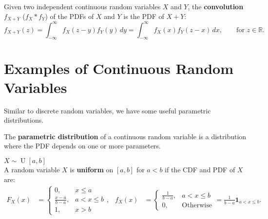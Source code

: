 \documentclass{huhtakm-template-book-v2}
\DeclareMathOperator{\U}{U}
\begin{document}
    \begin{defn}
        Given two independent continuous random variables $X$ and $Y$, the \textbf{convolution} $f_{X+Y}$ ($f_{X}*f_{Y}$) of the PDFs of $X$ and $Y$ is the PDF of $X+Y$:
        \begin{equation*}
            f_{X+Y}(z) = \int_{-\infty}^{\infty} f_{X}(z-y)f_{Y}(y)\,dy = \int_{-\infty}^{\infty} f_{X}(x)f_{Y}(z-x)\,dx, \qquad\text{for }z \in \mathbb{R}.
        \end{equation*}
    \end{defn}
    \newpage

\section{Examples of Continuous Random Variables}
    Similar to discrete random variables, we have some useful parametric distributions.
    \begin{defn}
        The \textbf{parametric distribution} of a continuous random variable is a distribution where the PDF depends on one or more parameters.
    \end{defn}
    \begin{eg} $X \sim \U[a, b]$\\
        A random variable $X$ is \textbf{uniform} on $[a, b]$ for $a < b$ if the CDF and PDF of $X$ are:
        \begin{align*}
            F_{X}(x) &= \begin{cases}
                0, &x \leq a\\
                \frac{x-a}{b-a}, &a < x \leq b\\
                1, &x > b
            \end{cases}, & f_{X}(x) &= \begin{cases}
                \frac{1}{b-a}, &a < x \leq b\\
                0, &\text{Otherwise}
            \end{cases} = \frac{1}{b-a}\mathbf{1}_{a < x \leq b}.
        \end{align*}
    \end{eg}
\end{document}
